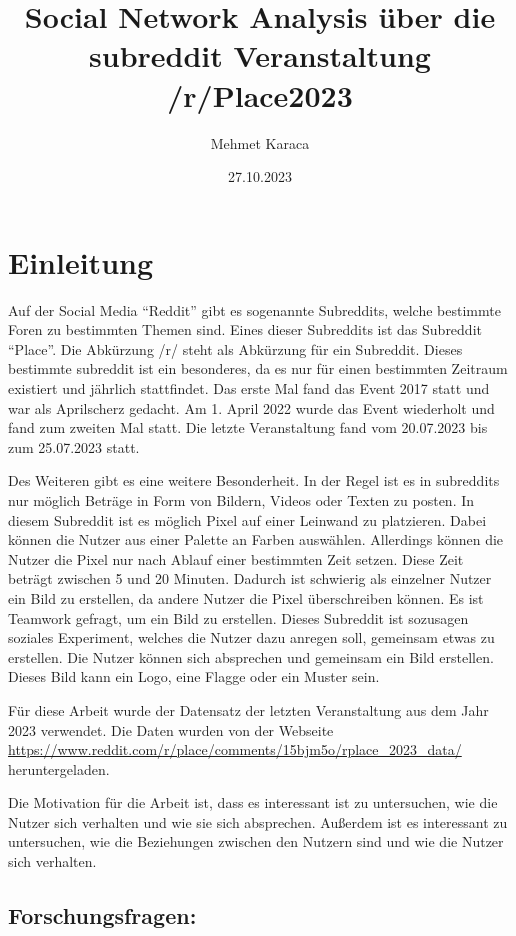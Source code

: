 \documentclass[
]{article}
\title{Social Network Analysis über die subreddit Veranstaltung
/r/Place2023}
\author{Mehmet Karaca}
\date{27.10.2023}
\begin{document}
\maketitle

{
\setcounter{tocdepth}{2}
\tableofcontents
}

\section{Einleitung}\label{sec-einleitung}

Auf der Social Media ``Reddit'' gibt es sogenannte Subreddits, welche
bestimmte Foren zu bestimmten Themen sind. Eines dieser Subreddits ist
das Subreddit ``Place''. Die Abkürzung /r/ steht als Abkürzung für ein
Subreddit. Dieses bestimmte subreddit ist ein besonderes, da es nur für
einen bestimmten Zeitraum existiert und jährlich stattfindet. Das erste
Mal fand das Event 2017 statt und war als Aprilscherz gedacht. Am 1.
April 2022 wurde das Event wiederholt und fand zum zweiten Mal statt.
Die letzte Veranstaltung fand vom 20.07.2023 bis zum 25.07.2023 statt.

Des Weiteren gibt es eine weitere Besonderheit. In der Regel ist es in
subreddits nur möglich Beträge in Form von Bildern, Videos oder Texten
zu posten. In diesem Subreddit ist es möglich Pixel auf einer Leinwand
zu platzieren. Dabei können die Nutzer aus einer Palette an Farben
auswählen. Allerdings können die Nutzer die Pixel nur nach Ablauf einer
bestimmten Zeit setzen. Diese Zeit beträgt zwischen 5 und 20 Minuten.
Dadurch ist schwierig als einzelner Nutzer ein Bild zu erstellen, da
andere Nutzer die Pixel überschreiben können. Es ist Teamwork gefragt,
um ein Bild zu erstellen. Dieses Subreddit ist sozusagen soziales
Experiment, welches die Nutzer dazu anregen soll, gemeinsam etwas zu
erstellen. Die Nutzer können sich absprechen und gemeinsam ein Bild
erstellen. Dieses Bild kann ein Logo, eine Flagge oder ein Muster sein.

Für diese Arbeit wurde der Datensatz der letzten Veranstaltung aus dem
Jahr 2023 verwendet. Die Daten wurden von der Webseite
\url{https://www.reddit.com/r/place/comments/15bjm5o/rplace_2023_data/}
heruntergeladen.

Die Motivation für die Arbeit ist, dass es interessant ist zu
untersuchen, wie die Nutzer sich verhalten und wie sie sich absprechen.
Außerdem ist es interessant zu untersuchen, wie die Beziehungen zwischen
den Nutzern sind und wie die Nutzer sich verhalten.

\subsection{Forschungsfragen:}\label{forschungsfragen}
\end{document}
